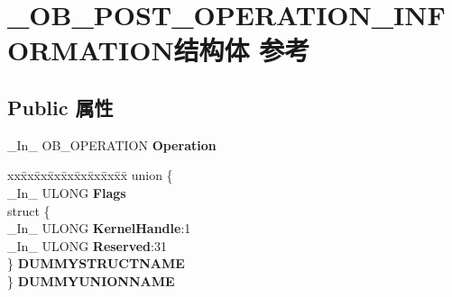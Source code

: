 \hypertarget{struct___o_b___p_o_s_t___o_p_e_r_a_t_i_o_n___i_n_f_o_r_m_a_t_i_o_n}{}\section{\+\_\+\+O\+B\+\_\+\+P\+O\+S\+T\+\_\+\+O\+P\+E\+R\+A\+T\+I\+O\+N\+\_\+\+I\+N\+F\+O\+R\+M\+A\+T\+I\+O\+N结构体 参考}
\label{struct___o_b___p_o_s_t___o_p_e_r_a_t_i_o_n___i_n_f_o_r_m_a_t_i_o_n}
\subsection*{Public 属性}
\begin{DoxyCompactItemize}
\item 
\mbox{\label{struct___o_b___p_o_s_t___o_p_e_r_a_t_i_o_n___i_n_f_o_r_m_a_t_i_o_n_ac93a8463a44068bee787774bbf14cc4a}} 
\+\_\+\+In\+\_\+ O\+B\+\_\+\+O\+P\+E\+R\+A\+T\+I\+ON {\bfseries Operation}
\item 
\mbox{\label{struct___o_b___p_o_s_t___o_p_e_r_a_t_i_o_n___i_n_f_o_r_m_a_t_i_o_n_a9f140708adfc9b858fa3d6cf30f2d97b}} 
\begin{tabbing}
xx\=xx\=xx\=xx\=xx\=xx\=xx\=xx\=xx\=\kill
union \{\\
\>\_In\_ ULONG {\bfseries Flags}\\
\>struct \{\\
\>\>\_In\_ ULONG {\bfseries KernelHandle}:1\\
\>\>\_In\_ ULONG {\bfseries Reserved}:31\\
\>\} {\bfseries DUMMYSTRUCTNAME}\\
\} {\bfseries DUMMYUNIONNAME}\\


\end{tabbing}
\end{DoxyCompactItemize}

